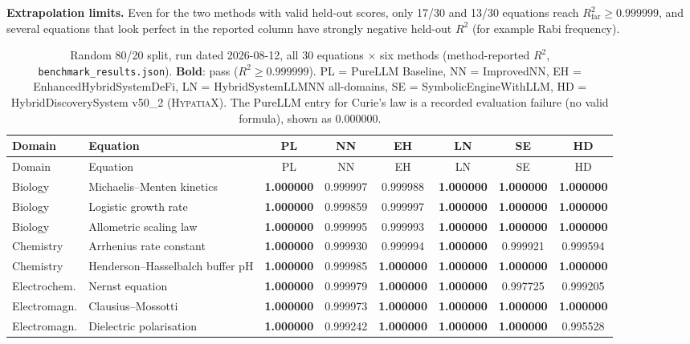 \documentclass[twoside,11pt]{article}
\newcommand{\Rsq}{R^{2}}
\begin{document}
\textbf{Extrapolation limits.} Even for the two methods with valid held-out scores, only 17/30 and 13/30
equations reach $\Rsq_{\text{far}} \geq 0.999999$, and several equations that look perfect in the reported
column have strongly negative held-out $\Rsq$ (for example Rabi frequency).

{\scriptsize\setlength{\tabcolsep}{2.5pt}
\begin{longtable}{p{1.9cm}p{4.3cm}cccccc}
\caption{Random 80/20 split, run dated 2026-08-12, all 30 equations $\times$ six methods (method-reported $\Rsq$, \texttt{benchmark\_results.json}). \textbf{Bold}: pass ($\Rsq \geq 0.999999$). PL = PureLLM Baseline, NN = ImprovedNN, EH = EnhancedHybridSystemDeFi, LN = HybridSystemLLMNN all-domains, SE = SymbolicEngineWithLLM, HD = HybridDiscoverySystem v50\_2 (\textsc{HypatiaX}). The PureLLM entry for Curie's law is a recorded evaluation failure (no valid formula), shown as $0.000000$.}
\label{tab:randomsplit}\\
\toprule
Domain & Equation & PL & NN & EH & LN & SE & HD \\
\midrule
\endfirsthead
\toprule
Domain & Equation & PL & NN & EH & LN & SE & HD \\
\midrule
\endhead
Biology & Michaelis--Menten kinetics & \textbf{1.000000} & 0.999997 & 0.999988 & \textbf{1.000000} & \textbf{1.000000} & \textbf{1.000000} \\
Biology & Logistic growth rate & \textbf{1.000000} & 0.999859 & 0.999997 & \textbf{1.000000} & \textbf{1.000000} & \textbf{1.000000} \\
Biology & Allometric scaling law & \textbf{1.000000} & 0.999995 & 0.999993 & \textbf{1.000000} & \textbf{1.000000} & \textbf{1.000000} \\
Chemistry & Arrhenius rate constant & \textbf{1.000000} & 0.999930 & 0.999994 & \textbf{1.000000} & 0.999921 & 0.999594 \\
Chemistry & Henderson--Hasselbalch buffer pH & \textbf{1.000000} & 0.999985 & \textbf{1.000000} & \textbf{1.000000} & \textbf{1.000000} & \textbf{1.000000} \\
Electrochem. & Nernst equation & \textbf{1.000000} & 0.999979 & \textbf{1.000000} & \textbf{1.000000} & 0.997725 & 0.999205 \\
Electromagn. & Clausius--Mossotti & \textbf{1.000000} & 0.999973 & \textbf{1.000000} & \textbf{1.000000} & \textbf{1.000000} & \textbf{1.000000} \\
Electromagn. & Dielectric polarisation & \textbf{1.000000} & 0.999242 & \textbf{1.000000} & \textbf{1.000000} & \textbf{1.000000} & 0.995528 \\

\end{longtable}}
\end{document}
